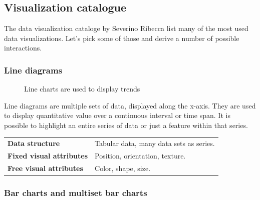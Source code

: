 \documentclass{article}
\newcommand{\conceptTable}[3]{%
    \begin{center}
    {\small
        \begin{tabulary}{\textwidth}{ll}
            \bf Data structure & #1 \\

            \bf Fixed visual attributes & #2 \\

            \bf Free visual attributes & #3  \\
        \end{tabulary}
    }
    \end{center}
}
\begin{document}
\subsection{Visualization catalogue}

The data visualization cataloge by Severino Ribecca list many of the most used data visualizations\cite{VisualizationCatalogue2017}.
Let's pick some of those and derive a number of possible interactions.



\subsubsection{Line diagrams}
\begin{figure}
  \begin{center}
    \qquad
  \end{center}
  \caption{Line charts are used to display trends}
  \label{fig:concept:chart-types:line-diagrams}
\end{figure}

Line diagrams are multiple sets of data, displayed along the x-axis.
They are used to display quantitative value over a continuous interval or time span.
It is possible to highlight an entire series of data or just a feature within that series.

\conceptTable{Tabular data, many data sets as series.}{Position, orientation, texture.}{Color, shape, size.}

\subsubsection{Bar charts and multiset bar charts}
\end{document}
